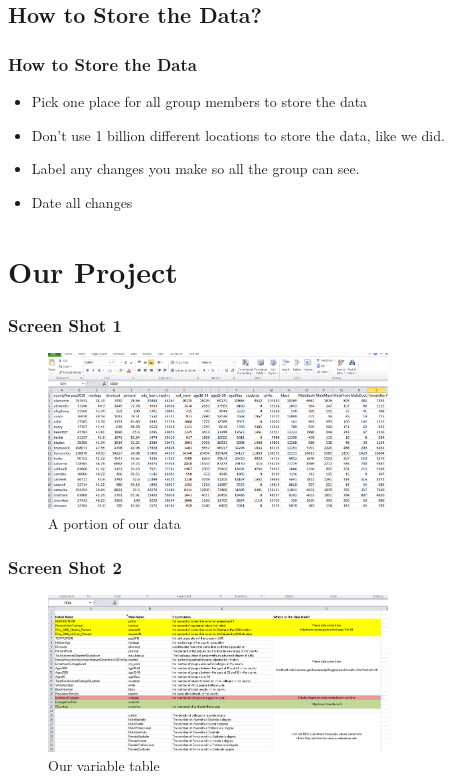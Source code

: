 \documentclass{beamer}\usepackage[]{graphicx}\usepackage[]{color}
\begin{document}
\subsection{How to Store the Data?}

\begin{frame}
\frametitle{How to Store the Data}

\begin{itemize}
\item Pick one place for all group members to store the data
\item Don't use 1 billion different locations to store the data, like we did.
\item Label any changes you make so all the group can see.
\item Date all changes
\end{itemize}
\end{frame}

\section{Our Project}

\begin{frame}
\frametitle{Screen Shot 1}
\begin{figure}[ht!]
\centering
\includegraphics[width=90mm]{excel.jpeg}
\caption{A portion of our data}
\label{Data}
\end{figure}
\end{frame}


\begin{frame}
\frametitle{Screen Shot 2}
\begin{figure}[ht!]
\centering
\includegraphics[width=90mm]{variable.jpeg}
\caption{Our variable table}
\label{Variable}
\end{figure}
\end{frame}
\end{document}
